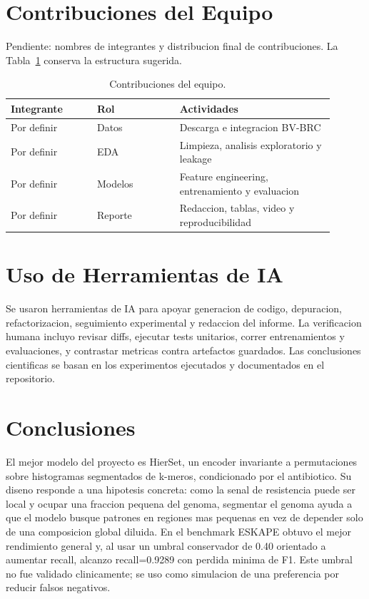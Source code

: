 \documentclass[journal,transmag]{../ieee_latex_template/IEEEtran}
\begin{document}
\section{Contribuciones del Equipo}
Pendiente: nombres de integrantes y distribucion final de contribuciones. La Tabla~\ref{tab:team-contributions} conserva la estructura sugerida.

\begin{table}[!t]
\caption{Contribuciones del equipo.}
\label{tab:team-contributions}
\centering
\small
\begin{tabular}{@{}p{0.24\linewidth}p{0.23\linewidth}p{0.43\linewidth}@{}}
\toprule
Integrante & Rol & Actividades \\
\midrule
Por definir & Datos & Descarga e integracion BV-BRC \\
Por definir & EDA & Limpieza, analisis exploratorio y leakage \\
Por definir & Modelos & Feature engineering, entrenamiento y evaluacion \\
Por definir & Reporte & Redaccion, tablas, video y reproducibilidad \\
\bottomrule
\end{tabular}
\end{table}

\section{Uso de Herramientas de IA}
Se usaron herramientas de IA para apoyar generacion de codigo, depuracion, refactorizacion, seguimiento experimental y redaccion del informe. La verificacion humana incluyo revisar diffs, ejecutar tests unitarios, correr entrenamientos y evaluaciones, y contrastar metricas contra artefactos guardados. Las conclusiones cientificas se basan en los experimentos ejecutados y documentados en el repositorio.

\section{Conclusiones}
El mejor modelo del proyecto es HierSet, un encoder invariante a permutaciones sobre histogramas segmentados de k-meros, condicionado por el antibiotico. Su diseno responde a una hipotesis concreta: como la senal de resistencia puede ser local y ocupar una fraccion pequena del genoma, segmentar el genoma ayuda a que el modelo busque patrones en regiones mas pequenas en vez de depender solo de una composicion global diluida. En el benchmark ESKAPE obtuvo el mejor rendimiento general y, al usar un umbral conservador de 0.40 orientado a aumentar recall, alcanzo recall=0.9289 con perdida minima de F1. Este umbral no fue validado clinicamente; se uso como simulacion de una preferencia por reducir falsos negativos.
\end{document}
